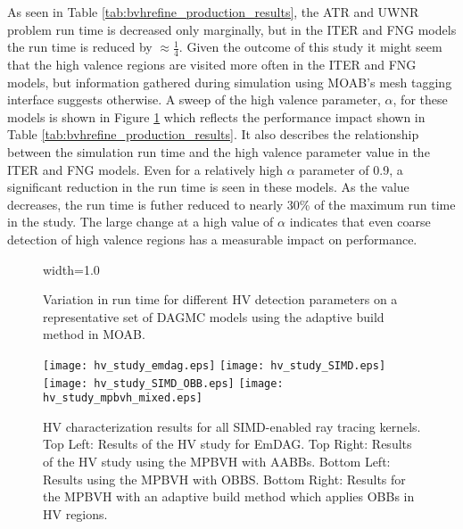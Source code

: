 As seen in Table \ref{tab:bvhrefine_production_results}, the ATR and UWNR
problem run time is decreased only marginally, but in the ITER and FNG models
the run time is reduced by $\approx\frac{1}{4}$. Given the outcome of this study
it might seem that the high valence regions are visited more often in the ITER
and FNG models, but information gathered during simulation using MOAB's mesh
tagging interface suggests otherwise. A sweep of the high valence parameter,
$\alpha$, for these models is shown in Figure \ref{fig:hv_parameter_study_moab}
which reflects the performance impact shown in Table
\ref{tab:bvhrefine_production_results}. It also describes the relationship
between the simulation run time and the high valence parameter value in the ITER
and FNG models. Even for a relatively high $\alpha$ parameter of 0.9, a
significant reduction in the run time is seen in these models. As the value
decreases, the run time is futher reduced to nearly 30\% of the maximum run time
in the study. The large change at a high value of $\alpha$ indicates that even
coarse detection of high valence regions has a measurable impact on performance.

\begin{figure}[H]
  \centering
  {width=1.0\textwidth}
  \caption[High valence detection parameter study.]{Variation in run time for
    different HV detection parameters on a representative set of DAGMC models
    using the adaptive build method in MOAB.}
  \label{fig:hv_parameter_study_moab}
\end{figure}


\begin{sidewaysfigure}
  \centering
  \texttt{[image: hv\_study\_emdag.eps]}
  \texttt{[image: hv\_study\_SIMD.eps]}
  \texttt{[image: hv\_study\_SIMD\_OBB.eps]}
  \texttt{[image: hv\_study\_mpbvh\_mixed.eps]}
  \caption[HV characterization studies using EmDAG and MPBVH.]{HV characterization results for all SIMD-enabled ray tracing
    kernels. Top Left: Results of the HV study for EmDAG. Top Right: Results of
    the HV study using the MPBVH with AABBs. Bottom Left: Results using the
    MPBVH with OBBS. Bottom Right: Results for the MPBVH with an adaptive build
    method which applies OBBs in HV regions.}
  \label{fig:simd_hv_studies}
\end{sidewaysfigure}

